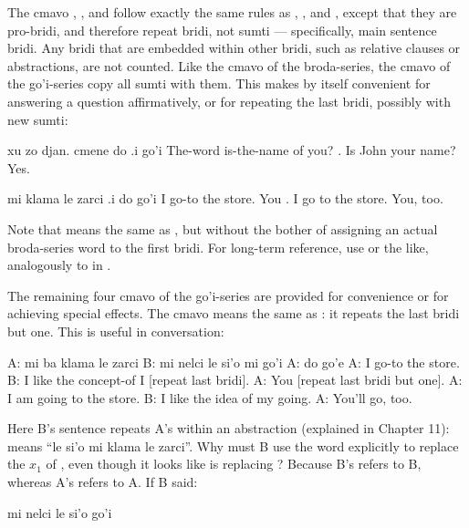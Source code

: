 The cmavo , , and  follow exactly
    the same rules as , , and , except that they
    are pro-bridi, and therefore repeat bridi, not sumti ---
    specifically, main sentence bridi. Any bridi that are embedded
    within other bridi, such as relative clauses or abstractions,
    are not counted. Like the cmavo of the broda-series, the cmavo
    of the go'i-series copy all sumti with them. This makes
     by itself convenient for answering a question
    affirmatively, or for repeating the last bridi, possibly with
    new sumti:
\begin{example}
xu zo djan. cmene do\n
\T	.i go'i\n
{} The-word  is-the-name of you?\n
{}.\n
Is John your name?  Yes.
\end{example}

\begin{example}
mi klama le zarci .i do go'i\n
I go-to the store.  You .\n
I go to the store.  You, too.
\end{example}

Note that  means the same as , but without the bother of
    assigning an actual broda-series word to the first bridi. For
    long-term reference, use  or the like,
    analogously to  in . 

The remaining four cmavo of the go'i-series are provided for
    convenience or for achieving special effects. The cmavo
     means the same as : it repeats the last
    bridi but one. This is useful in conversation:
\begin{example}
A: mi ba klama le zarci\n
B: mi nelci le si'o mi go'i\n
A: do go'e
\n
A: I  go-to the store.\n
B: I like the concept-of I [repeat last bridi].\n
A: You [repeat last bridi but one].
\n
A: I am going to the store.\n
B: I like the idea of my going.\n
A: You'll go, too.
\end{example}

Here B's sentence repeats A's within an abstraction
    (explained in Chapter 11):  means ``le si'o
    mi klama le zarci''. Why must B use the word  explicitly
    to replace the $x_1$ of , even though it
    looks like  is replacing ? Because B's 
    refers to B, whereas A's  refers to A. If B said:
\begin{example}
mi nelci le si'o go'i
\end{example}


